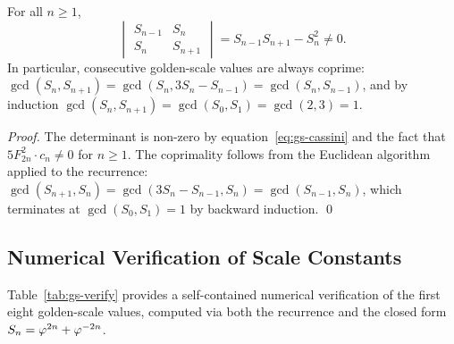 \begin{corollary}\label{cor:gs-det}
For all \(n \ge 1\),
\[
  \begin{vmatrix} S_{n-1} & S_n \\ S_n & S_{n+1} \end{vmatrix}
  = S_{n-1}S_{n+1} - S_n^2 \ne 0 .
\]
In particular, consecutive golden-scale values are always coprime:
\(\gcd(S_n, S_{n+1}) = \gcd(S_n, 3S_n - S_{n-1}) = \gcd(S_n, S_{n-1})\),
and by induction \(\gcd(S_n, S_{n+1}) = \gcd(S_0, S_1) = \gcd(2,3) = 1\).
\end{corollary}

\begin{proof}
The determinant is non-zero by equation~\eqref{eq:gs-cassini} and the
fact that \(5F_{2n}^2 \cdot c_n \ne 0\) for \(n \ge 1\).  The
coprimality follows from the Euclidean algorithm applied to the
recurrence: \(\gcd(S_{n+1}, S_n) = \gcd(3S_n - S_{n-1}, S_n) =
\gcd(S_{n-1}, S_n)\), which terminates at \(\gcd(S_0,S_1) = 1\) by
backward induction.
\qed
\end{proof}

\subsection{Numerical Verification of Scale Constants}
\label{subsec:gs-numerical}

Table~\ref{tab:gs-verify} provides a self-contained numerical
verification of the first eight golden-scale values, computed via
both the recurrence and the closed form \(S_n = \varphi^{2n} +
\varphi^{-2n}\).

\begin{table}[htbp]
\centering
\caption{Verification of golden-scale values.
\(\phipow{2} \approx 2.6180339887\), \(\phipow{-2} \approx 0.3819660113\).}
\label{tab:gs-verify}
\end{table}

